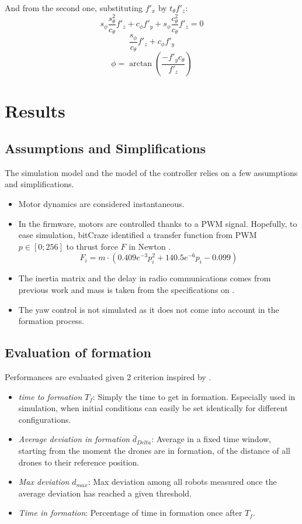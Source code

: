 \documentclass[a4paper, 12pt]{report}
\begin{document}
And from the second one, substituting $f'_x$ by $t_\theta f'_z$:
\[ s_\phi \frac{s_\theta^2}{c_\theta} f'_z + c_\phi f'_y + s_\phi \frac{c_\theta^2}{c_\theta} f'_z = 0 \]
\[ \frac{s_\phi}{c_\theta} f'_z + c_\phi f'_y \]
\[ \phi = \arctan \left( \frac{- f'_y c_\theta}{f'_z} \right)\]





\newpage
\section{Results}
\subsection{Assumptions and Simplifications}
The simulation model and the model of the controller relies on a few assumptions and simplifications.
\begin{itemize}
\item Motor dynamics are considered instantaneous.
\item In the firmware, motors are controlled thanks to a PWM signal. Hopefully, to ease simulation, bitCraze identified a transfer function from PWM $p\in[0;256]$ to thrust force $F$ in Newton \cite{bitcrazeWiki}.
\[ F_i = m \cdot (0.409e^{-3}p_i ^2 + 140.5 e^{-6}p_ i - 0.099 )\]
\item The inertia matrix and the delay in radio communications comes from previous work \cite{Dubois2015} and mass is taken from the specifications on \cite{bitcraze}.
\item The yaw control is not simulated as it does not come into account in the formation process.
\end{itemize}
\subsection{Evaluation of formation}
Performances are evaluated given 2 criterion inspired by \cite{Arkin1999, Mataric2002}.
\begin{itemize}
\item \emph{time to formation} $T_f$: Simply the time to get in formation. Especially used in simulation, when initial conditions can easily be set identically for different configurations.
\item \emph{Average deviation in formation} $\bar d_{Delta }$: Average in a fixed time window, starting from the moment the drones are in formation, of the distance of all drones to their reference position.
\item \emph{Max deviation} $d_{max}$: Max deviation among all robots measured once the average deviation has reached a given threshold.
\item \emph{Time in formation}: Percentage of time in formation once after $T_f$.
\end{itemize}
\end{document}
